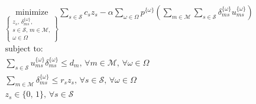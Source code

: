 \documentclass[onecolumn,draftcls]{IEEEtran}
\begin{document}
\vspace{5mm}
\begin{tcolorbox}[title = Problem 2 (Deterministic Equivalent Program of Problem 1)]
\begin{align}
& 
\underset{\left\{ \substack{
	z_s,\, \delta_{ms}^{\{\omega\}},\\
	s \in \mathcal{S},\, m \in \mathcal{M},\\
	\omega \in \Omega} \right\}} {\text{minimize}}
\sum_{s \in \mathcal{S}} c_s z_s - \alpha \sum_{\omega \in \Omega} p^{\{\omega\}} \left( \sum_{m \in \mathcal{M}} \sum_{s \in \mathcal{S}} \delta_{ms}^{\{\omega\}} u_{ms}^{\{\omega\}} \right) \label{eq:P2}\\
& \text{subject to:}  \nonumber \\
& \sum_{s \in \mathcal{S}} u_{ms}^{\{\omega\}} \delta_{ms}^{\{\omega\}} \leq d_m,\, \forall m \in \mathcal{M},\, \forall \omega \in \Omega \label{eq:P2C1}\\
& \sum_{m \in \mathcal{M}} \delta_{ms}^{\{\omega\}} \leq r_s z_s,\, \forall s \in \mathcal{S},\, \forall \omega \in \Omega \label{eq:P2C2}\\
& z_s \in \{0,\, 1\},\, \forall s \in \mathcal{S} \label{eq:P2C3}
\end{align}
\end{tcolorbox}

\iffalse
\vspace{5mm}
\noindent \textbf{Problem 2 (DEP of Problem 1)}



\begin{equation} \label{eq:P2}
\underset{\left\{ \substack{
	z_s,\, \delta_{ms}^{\{\omega\}},\\
	s \in \mathcal{S},\, m \in \mathcal{M},\\
	\omega \in \Omega} \right\}} {\text{minimize}}
\sum_{s \in \mathcal{S}} c_s z_s - \alpha \sum_{\omega \in \Omega} p^{\{\omega\}} \left( \sum_{m \in \mathcal{M}} \sum_{s \in \mathcal{S}} \delta_{ms}^{\{\omega\}} u_{ms}^{\{\omega\}} \right)
\end{equation}
subject to:
\begin{equation} \label{eq:P2C1}
\sum_{s \in \mathcal{S}} u_{ms}^{\{\omega\}} \delta_{ms}^{\{\omega\}} \leq d_m,\, \forall m \in \mathcal{M},\, \forall \omega \in \Omega
\end{equation}
\begin{equation} \label{eq:P2C2}
\sum_{m \in \mathcal{M}} \delta_{ms}^{\{\omega\}} \leq r_s z_s,\, \forall s \in \mathcal{S},\, \forall \omega \in \Omega
\end{equation}
\begin{equation} \label{eq:P2C3}
z_s \in \{0,\, 1\},\, \forall s \in \mathcal{S}
\end{equation}
\fi
\end{document}
